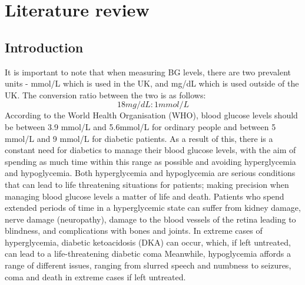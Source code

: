 \section{Literature review} %
    \subsection{Introduction}

    It is important to note that when measuring BG levels, there are two prevalent units - mmol/L which is used in the UK, and mg/dL which is used outside of the UK. The conversion ratio between the two is as follows: \[18mg/dL : 1mmol/L\] According to the World Health Organisation (WHO), blood glucose levels should be between 3.9 mmol/L and 5.6mmol/L \cite{WHOBGL} for ordinary people and between 5 mmol/L and 9 mmol/L for diabetic patients.   As a result of this, there is a constant need for diabetics to manage their blood glucose levels, with the aim of spending as much time within this range as possible and avoiding hyperglycemia and hypoglycemia. Both hyperglycemia and hypoglycemia are serious conditions that can lead to life threatening situations for patients; making precision when managing blood glucose levels a matter of life and death. Patients who spend extended periods of time in a hyperglycemic state can suffer from kidney damage, nerve damage (neuropathy), damage to the blood vessels of the retina leading to blindness, and complications with bones and joints. In extreme cases of hyperglycemia, diabetic ketoacidosis (DKA) can occur, which, if left untreated, can lead to a life-threatening diabetic coma \cite{mayohyper} Meanwhile, hypoglycemia affords a range of different issues, ranging from slurred speech and numbness to seizures, coma and death in extreme cases if left untreated\cite{adahypo}. 
    \newline
